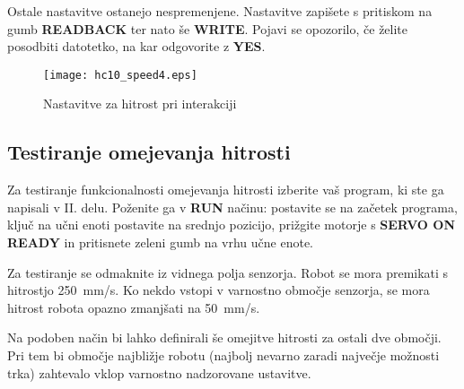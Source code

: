 Ostale nastavitve ostanejo nespremenjene. Nastavitve zapišete s pritiskom na gumb \textbf{READBACK} ter nato še \textbf{WRITE}. Pojavi se opozorilo, če želite posodbiti datotetko, na kar odgovorite z \textbf{YES}.

\begin{figure}[!hbt]
	\centering
	\texttt{[image: hc10\_speed4.eps]}
	\caption{Nastavitve za hitrost pri interakciji}
	\label{fig:hc10_speed4}
\end{figure}

\subsection{Testiranje omejevanja hitrosti} \label{test3del}

Za testiranje funkcionalnosti omejevanja hitrosti izberite vaš program, ki ste ga napisali v II. delu. Poženite ga v \textbf{RUN} načinu: postavite se na začetek programa, ključ na učni enoti postavite na srednjo pozicijo, prižgite motorje s \textbf{SERVO ON READY} in pritisnete zeleni gumb na vrhu učne enote.

Za testiranje se odmaknite iz vidnega polja senzorja. Robot se mora premikati s hitrostjo 250~mm/s. Ko nekdo vstopi v varnostno območje senzorja, se mora hitrost robota opazno zmanjšati na 50~mm/s.

Na podoben način bi lahko definirali še omejitve hitrosti za ostali dve območji. Pri tem bi območje najbližje robotu (najbolj nevarno zaradi največje možnosti trka) zahtevalo vklop varnostno nadzorovane ustavitve.



